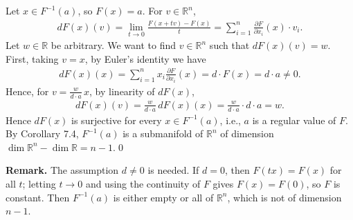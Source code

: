 Let $x\in F^{-1}(a)$, so $F(x)=a$. For $v\in\mathbb{R}^n$,
\begin{align}
    dF(x)(v)=\lim_{t\to 0}\frac{F(x+tv)-F(x)}{t}=\sum_{i=1}^{n}\frac{\partial F}{\partial x_i}(x)\cdot v_i.
\end{align}
Let $w\in\mathbb{R}$ be arbitrary. We want to find $v\in\mathbb{R}^n$ such that $dF(x)(v)=w$. First, taking $v=x$, by Euler's identity we have
\begin{align}
    dF(x)(x)=\sum_{i=1}^{n}x_i\frac{\partial F}{\partial x_i}(x)=d\cdot F(x)=d\cdot a\neq 0.
\end{align}
Hence, for $v=\frac{w}{d\cdot a}\,x$, by linearity of $dF(x)$,
\begin{align}
    dF(x)(v)=\frac{w}{d\cdot a}\,dF(x)(x)=\frac{w}{d\cdot a}\cdot d\cdot a=w.
\end{align}
Hence $dF(x)$ is surjective for every $x\in F^{-1}(a)$, i.e., $a$ is a regular value of $F$. By Corollary 7.4, $F^{-1}(a)$ is a submanifold of $\mathbb{R}^n$ of dimension $\dim\mathbb{R}^n-\dim\mathbb{R}=n-1$.\qed

\textbf{Remark.} The assumption $d\neq 0$ is needed. If $d=0$, then $F(tx)=F(x)$ for all $t$; letting $t\to 0$ and using the continuity of $F$ gives $F(x)=F(0)$, so $F$ is constant. Then $F^{-1}(a)$ is either empty or all of $\mathbb{R}^n$, which is not of dimension $n-1$.